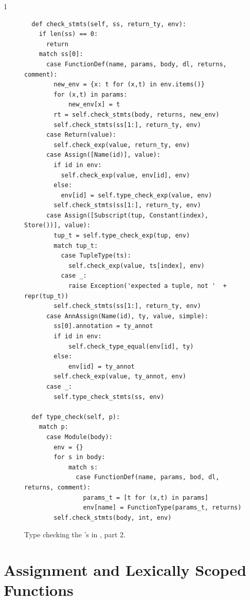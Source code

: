 \documentclass[7x10,nocrop]{TimesAPriori_MIT}%
\def\pythonEd{1}
\def\edition{1}
\begin{document}
{\if\edition\pythonEd 
\begin{figure}[tbp]
\begin{lstlisting}
  def check_stmts(self, ss, return_ty, env):
    if len(ss) == 0:
      return
    match ss[0]:
      case FunctionDef(name, params, body, dl, returns, comment):
        new_env = {x: t for (x,t) in env.items()}
        for (x,t) in params:
            new_env[x] = t
        rt = self.check_stmts(body, returns, new_env)
        self.check_stmts(ss[1:], return_ty, env)
      case Return(value):
        self.check_exp(value, return_ty, env)
      case Assign([Name(id)], value):
        if id in env:
          self.check_exp(value, env[id], env)
        else:
          env[id] = self.type_check_exp(value, env)
        self.check_stmts(ss[1:], return_ty, env)
      case Assign([Subscript(tup, Constant(index), Store())], value):
        tup_t = self.type_check_exp(tup, env)
        match tup_t:
          case TupleType(ts):
            self.check_exp(value, ts[index], env)
          case _:
            raise Exception('expected a tuple, not '  + repr(tup_t))
        self.check_stmts(ss[1:], return_ty, env)
      case AnnAssign(Name(id), ty, value, simple):
        ss[0].annotation = ty_annot
        if id in env:
            self.check_type_equal(env[id], ty)
        else:
            env[id] = ty_annot
        self.check_exp(value, ty_annot, env)
      case _:
        self.type_check_stmts(ss, env)

  def type_check(self, p):
    match p:
      case Module(body):
        env = {}
        for s in body:
            match s:
              case FunctionDef(name, params, bod, dl, returns, comment):
                params_t = [t for (x,t) in params]
                env[name] = FunctionType(params_t, returns)
        self.check_stmts(body, int, env)
\end{lstlisting}
\caption{Type checking the 's in \LangLam{}, part 2.}
\label{fig:type-check-Llambda-part2}
\end{figure}
\fi}

\clearpage

\section{Assignment and Lexically Scoped Functions}
\label{sec:assignment-scoping}
\end{document}

